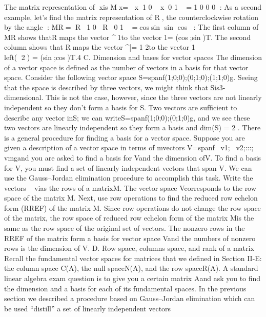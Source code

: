 {{{{{{The matrix representation of xis
Mx=
x1
0
x0
1
=1 0
0 0
:
As a second example, let’s ﬁnd the matrix representation of R, the
counterclockwise rotation by the angle :
MR=
R1
0
R0
1
=cos sin
sin cos
:
The ﬁrst column of MRshows thatRmaps the vector ^{1\0to the
vector 1\= \left(cos;sin\right)T. The second column shows that Rmaps the
vector ^|= 1\
2to the vector 1\\left(
2\+\right) = \left( sin;cos\right)T.4
C. Dimension and bases for vector spaces
The dimension of a vector space is deﬁned as the number of vectors
in a basis for that vector space. Consider the following vector space
S=spanf\left(1;0;0\right);\left(0;1;0\right);\left(1;1;0\right)g. Seeing that the space is described
by three vectors, we might think that Sis3-dimensional. This is not the
case, however, since the three vectors are not linearly independent so they
don’t form a basis for S. Two vectors are sufﬁcient to describe any vector
inS; we can writeS=spanf\left(1;0;0\right);\left(0;1;0\right)g, and we see these two
vectors are linearly independent so they form a basis and dim\left(S\right) = 2 .
There is a general procedure for ﬁnding a basis for a vector space.
Suppose you are given a description of a vector space in terms of mvectors
V=spanf~ v1;~ v2;:::;~ vmgand you are asked to ﬁnd a basis for Vand the
dimension ofV. To ﬁnd a basis for V, you must ﬁnd a set of linearly
independent vectors that span V. We can use the Gauss–Jordan elimination
procedure to accomplish this task. Write the vectors ~ vias the rows of a
matrixM. The vector space Vcorresponds to the row space of the matrix
M. Next, use row operations to ﬁnd the reduced row echelon form \left(RREF\right)
of the matrix M. Since row operations do not change the row space of the
matrix, the row space of reduced row echelon form of the matrix Mis the
same as the row space of the original set of vectors. The nonzero rows in
the RREF of the matrix form a basis for vector space Vand the numbers
of nonzero rows is the dimension of V.
D. Row space, columns space, and rank of a matrix
Recall the fundamental vector spaces for matrices that we deﬁned in
Section II-E: the column space C\left(A\right), the null spaceN\left(A\right), and the row
spaceR\left(A\right). A standard linear algebra exam question is to give you a
certain matrix Aand ask you to ﬁnd the dimension and a basis for each
of its fundamental spaces.
In the previous section we described a procedure based on Gauss–Jordan
elimination which can be used “distill” a set of linearly independent vectors
}}}}}}}

